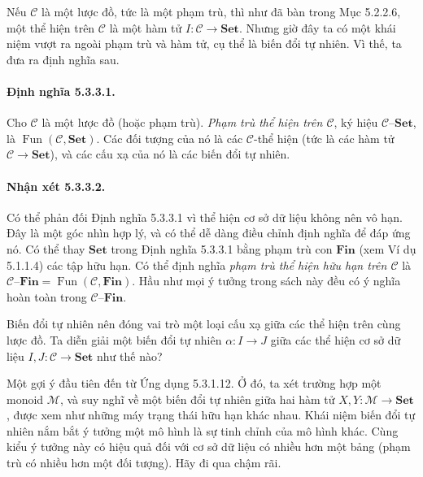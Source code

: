 Nếu $\mathcal C$ là một lược đồ, tức là một phạm trù, thì như đã bàn trong Mục 5.2.2.6, một thể hiện trên $\mathcal C$ là một hàm tử $I:\mathcal C\to\mathbf{Set}$. Nhưng giờ đây ta có một khái niệm vượt ra ngoài phạm trù và hàm tử, cụ thể là biến đổi tự nhiên. Vì thế, ta đưa ra định nghĩa sau.
\paragraph{Định nghĩa 5.3.3.1.} Cho $\mathcal C$ là một lược đồ (hoặc phạm trù). \emph{Phạm trù thể hiện trên $\mathcal C$}, ký hiệu $\mathcal C\text{--}\mathbf{Set}$, là $\operatorname{Fun}(\mathcal C,\mathbf{Set})$. Các đối tượng của nó là các $\mathcal C$-thể hiện (tức là các hàm tử $\mathcal C\to\mathbf{Set}$), và các cấu xạ của nó là các biến đổi tự nhiên.
\paragraph{Nhận xét 5.3.3.2.} Có thể phản đối Định nghĩa 5.3.3.1 vì thể hiện cơ sở dữ liệu không nên vô hạn. Đây là một góc nhìn hợp lý, và có thể dễ dàng điều chỉnh định nghĩa để đáp ứng nó. Có thể thay $\mathbf{Set}$ trong Định nghĩa 5.3.3.1 bằng phạm trù con $\mathbf{Fin}$ (xem Ví dụ 5.1.1.4) các tập hữu hạn. Có thể định nghĩa \emph{phạm trù thể hiện hữu hạn trên $\mathcal C$} là $\mathcal C\text{--}\mathbf{Fin}=\operatorname{Fun}(\mathcal C,\mathbf{Fin})$. Hầu như mọi ý tưởng trong sách này đều có ý nghĩa hoàn toàn trong $\mathcal C\text{--}\mathbf{Fin}$.

Biến đổi tự nhiên nên đóng vai trò một loại cấu xạ giữa các thể hiện trên cùng lược đồ. Ta diễn giải một biến đổi tự nhiên $\alpha:I\to J$ giữa các thể hiện cơ sở dữ liệu $I,J:\mathcal C\to\mathbf{Set}$ như thế nào?

Một gợi ý đầu tiên đến từ Ứng dụng 5.3.1.12. Ở đó, ta xét trường hợp một monoid $\mathcal M$, và suy nghĩ về một biến đổi tự nhiên giữa hai hàm tử $X,Y:\mathcal M\to\mathbf{Set}$, được xem như những máy trạng thái hữu hạn khác nhau. Khái niệm biến đổi tự nhiên nắm bắt ý tưởng một mô hình là sự tinh chỉnh của mô hình khác. Cùng kiểu ý tưởng này có hiệu quả đối với cơ sở dữ liệu có nhiều hơn một bảng (phạm trù có nhiều hơn một đối tượng). Hãy đi qua chậm rãi.

